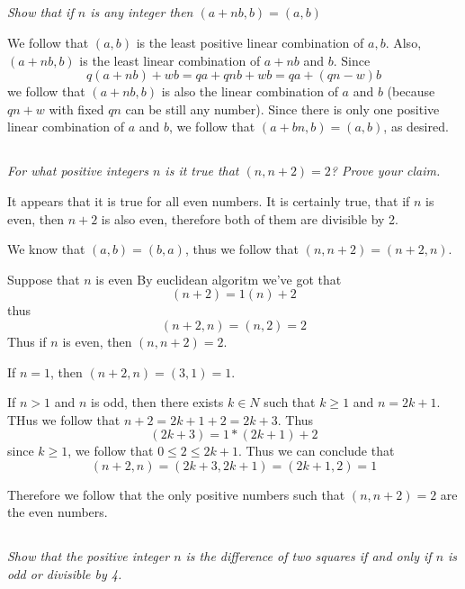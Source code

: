 \documentclass[11pt,oneside,titlepage]{book}
\begin{document}
\subsection{}

\textit{Show that if $n$ is any integer then $(a + nb, b) = (a, b)$}

We follow that $(a, b)$ is the least positive linear combination of $a, b$. Also,
$(a + nb, b)$ is the least linear combination of $a + nb$ and $b$. Since
$$q(a + nb) + wb = qa + qnb + wb = qa + (qn - w) b$$
we follow that $(a + nb, b)$ is also the linear combination of $a$ and $b$ (because $qn + w$
with fixed $qn$ can be still any number). Since
there is only one positive linear combination of $a$ and $b$, we follow that
$(a + bn, b) = (a, b)$, as desired.

\subsection{}

\textit{For what positive integers $n$ is it true that $(n, n + 2) = 2$? Prove your claim.}

It appears that it is true for all even numbers. It is certainly true, that if $n$
is even, then $n + 2$ is also even, therefore both of them are divisible by 2.

We know that $(a, b) = (b, a)$, thus we follow that $(n, n + 2) = (n + 2, n)$.

Suppose that $n$ is even
By euclidean algoritm we've got that
$$(n + 2) = 1(n) + 2$$
thus
$$(n + 2, n) = (n, 2) = 2$$
Thus if $n$ is even, then $(n, n + 2) = 2$.

If $n = 1$, then $(n + 2, n) = (3, 1) = 1$.

If $n > 1$ and $n$ is odd, then there exists $k \in N$ such that $k \geq  1$ and  $n = 2k + 1$.
THus we follow that $n + 2 = 2k + 1 + 2 = 2k + 3$. Thus 
$$(2k + 3) = 1*(2k + 1) + 2$$
since $k \geq 1$, we follow that $0 \leq 2 \leq 2k + 1$.
Thus we can conclude that
$$(n + 2, n) = (2k + 3, 2k + 1) = (2k + 1, 2) = 1$$

Therefore we follow that the only positive numbers such that $(n, n + 2) = 2$ are
the even numbers.

\subsection{}

\textit{Show that the positive integer $n$ is the difference of two squares if and
  only if $n$ is odd or divisible by 4.}
\end{document}
